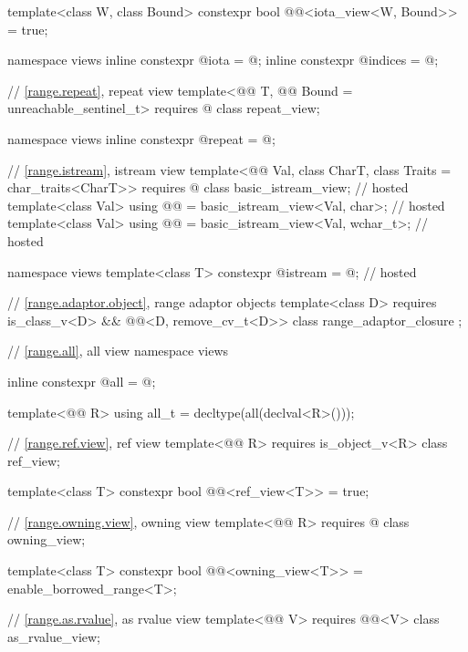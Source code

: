 \begin{codeblock}
{  template<class W, class Bound>
    constexpr bool @@<iota_view<W, Bound>> = true;

  namespace views {
    inline constexpr @\unspecnc@ iota = @\unspecnc@;
    inline constexpr @\unspecnc@ indices = @\unspecnc@;
  }

  // \ref{range.repeat}, repeat view
  template<@@ T, @@ Bound = unreachable_sentinel_t>
    requires @\seebelow@
  class repeat_view;

  namespace views { inline constexpr @\unspecnc@ repeat = @\unspecnc@; }

  // \ref{range.istream}, istream view
  template<@@ Val, class CharT, class Traits = char_traits<CharT>>
    requires @\seebelow@
  class basic_istream_view;                                                         // hosted
  template<class Val>
    using @@ = basic_istream_view<Val, char>;                             // hosted
  template<class Val>
    using @@ = basic_istream_view<Val, wchar_t>;                         // hosted

  namespace views {
    template<class T> constexpr @\unspecnc@ istream = @\unspecnc@;                  // hosted
  }

  // \ref{range.adaptor.object}, range adaptor objects
  template<class D>
    requires is_class_v<D> && @@<D, remove_cv_t<D>>
  class range_adaptor_closure { };

  // \ref{range.all}, all view
  namespace views {
    inline constexpr @\unspecnc@ all = @\unspecnc@;

    template<@@ R>
      using all_t = decltype(all(declval<R>()));
  }

  // \ref{range.ref.view}, ref view
  template<@@ R>
    requires is_object_v<R>
  class ref_view;

  template<class T>
    constexpr bool @@<ref_view<T>> = true;

  // \ref{range.owning.view}, owning view
  template<@@ R>
    requires @\seebelow@
  class owning_view;

  template<class T>
    constexpr bool @@<owning_view<T>> =
      enable_borrowed_range<T>;

  // \ref{range.as.rvalue}, as rvalue view
  template<@@ V>
    requires @@<V>
  class as_rvalue_view;

}
\end{codeblock}
